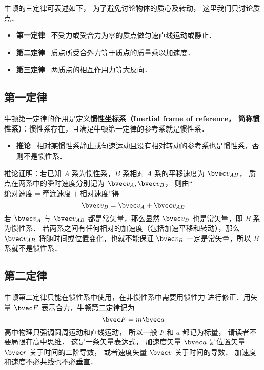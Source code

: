 

牛顿的三定律可表述如下， 为了避免讨论物体的质心及转动， 这里我们只讨论质点．
\begin{itemize}
\item \textbf{第一定律} \ 不受力或受合力为零的质点做匀速直线运动或静止．
\item \textbf{第二定律} \ 质点所受合外力等于质点的质量乘以加速度．
\item \textbf{第三定律} \ 两质点的相互作用力等大反向．
\end{itemize}

\subsection{第一定律}

牛顿第一定律的作用是定义\textbf{惯性坐标系（Inertial frame of reference， 简称惯性系）}：惯性系存在，且满足牛顿第一定律的参考系就是惯性系．

\begin{itemize}
\item \textbf{推论} \ 相对某惯性系静止或匀速运动且没有相对转动的参考系也是惯性系，否则不是惯性系．
\end{itemize}

推论证明：若已知 $A$ 系为惯性系，$B$ 系相对 $A$ 系的平移速度为 $\bvec v_{AB}$， 质点在两系中的瞬时速度分别记为 $\bvec v_A, \bvec v_B$， 则由“$\text{绝对速度} = \text{牵连速度} + \text{相对速度}$”得
\begin{equation}
\bvec v_{B} = \bvec v_{A} + \bvec v_{AB}
\end{equation}
若 $\bvec v_{A}$ 与 $\bvec v_{AB}$ 都是常矢量，那么显然 $\bvec v_{B}$ 也是常矢量，即 $B$ 系为惯性系． 若两系之间有任何相对的加速度（包括加速平移和转动），那么 $\bvec v_{AB}$ 将随时间或位置变化，也就不能保证 $\bvec v_B$ 一定是常矢量，所以 $B$ 系就不是惯性系．


\subsection{第二定律}
牛顿第二定律只能在惯性系中使用，在非惯性系中需要用惯性力 进行修正．用矢量 $\bvec F$ 表示合力，牛顿第二定律记为
\begin{equation}\label{New3_eq1}
\bvec F = m\bvec a
\end{equation}
高中物理只强调圆周运动和直线运动， 所以一般 $F$ 和 $a$ 都记为标量， 请读者不要局限在高中思维． 这是一条矢量表达式， 加速度矢量 $\bvec a$ 是位置矢量 $\bvec r$ 关于时间的二阶导数， 或者速度矢量 $\bvec v$ 关于时间的导数． 加速度和速度不必共线也不必垂直．

